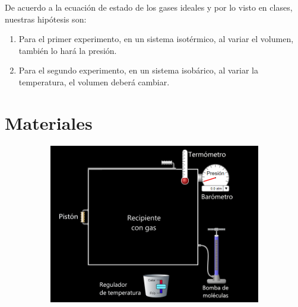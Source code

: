 \documentclass[a4paper, 12p]{article}
\begin{document}
De acuerdo a la ecuación de estado de los gases ideales y por lo visto en clases, nuestras hipótesis son:
\begin{enumerate}
      \item Para el primer experimento, en un sistema isotérmico, al variar el volumen, también lo hará la presión.
      \item Para el segundo experimento, en un sistema isobárico, al variar la temperatura, el volumen deberá cambiar.
\end{enumerate}

\newpage
\section{Materiales}
\begin{figure}[h!]
      \centering
      \includegraphics[width= 12cm, height= 7cm]{imag/Materiales.png}
\end{figure}


\end{document}
